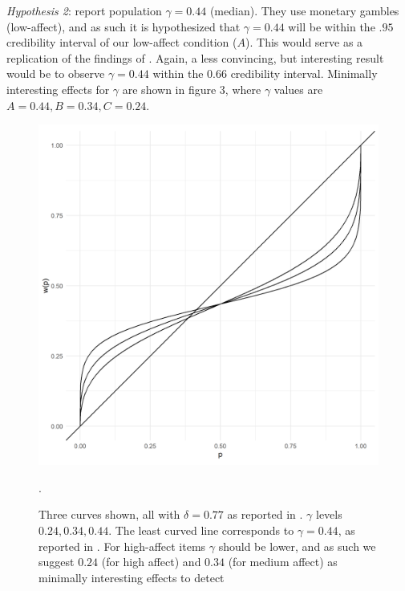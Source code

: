 \documentclass[12pt]{article}
\begin{document}
\emph{Hypothesis 2}: \textcite{gonzalez1999shape} report
population $\gamma = 0.44$ (median).
They use monetary gambles (low-affect),
and as such it is hypothesized that
$\gamma = 0.44$ will be within the  $.95$
credibility interval of our low-affect
condition ($A$). This would serve as
a replication of the findings of
\textcite{gonzalez1999shape}. Again, a
less convincing, but interesting result would
be to observe $\gamma = 0.44$ within the
 $0.66$ credibility interval. Minimally
interesting effects for $\gamma$ are
shown in figure 3, where  $\gamma$
values are  $A = 0.44, B = 0.34, C = 0.24$.

\begin{figure}[H]
	\includegraphics[width = \linewidth]{../Figures/ourHyp.png}
	\caption{Three curves shown, all with $\delta = 0.77$
	as reported in \textcite{gonzalez1999shape}.
	$\gamma$ levels $0.24, 0.34, 0.44$. The
	least curved line corresponds to $\gamma = 0.44$,
	as reported in \textcite{gonzalez1999shape}.
	For high-affect items $\gamma$ should
	be lower, and as such we suggest $0.24$
	(for high affect) and  $0.34$ (for medium
	affect) as minimally interesting effects
to detect}.
\end{figure}
\end{document}
